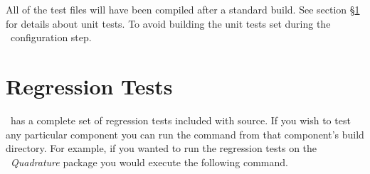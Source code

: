 All of the test files will have been compiled after a standard build.
See section \S\ref{regression} for details about unit tests.  To avoid
building the unit tests set  during the
\cmake\ configuration step.









\section{Regression Tests}
\label{regression}

\draco\ has a complete set of regression tests included with source.
If you wish to test any particular component you can run the command
 from that component's build directory.  For example, if
you wanted to run the regression tests on the
\draco\ \emph{Quadrature} package you would execute the following
command.


